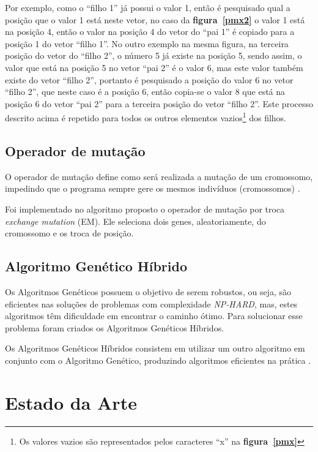 \documentclass{abnt}
\begin{document}
	   		Por exemplo, como o ``filho 1'' já possui o valor 1, então é pesquisado qual a posição que o valor 1 está neste vetor, no caso da \textbf{figura~\ref{pmx2}} o valor 1 está na posição 4, então o valor na posição 4 do vetor do ``pai 1'' é copiado para a posição 1 do vetor ``filho 1''. No outro exemplo na mesma figura, na terceira posição do vetor do ``filho 2'',  o número 5 já existe na posição 5, sendo assim, o valor que está na posição 5 no vetor ``pai 2'' é o valor 6, mas este valor também existe do vetor ``filho 2'', portanto é pesquisado a posição do valor 6 no vetor ``filho 2'', que neste caso é a posição 6, então copia-se o valor 8 que está na posição 6 do vetor ``pai 2'' para a terceira posição do vetor ``filho 2''. 
	   		Este processo descrito acima é repetido para todos os outros elementos vazios\footnote{Os valores vazios são representados pelos caracteres ``x'' na \textbf{figura~\ref{pmx}}} dos filhos.
	   		  
		\section{Operador de mutação}
			\label{Sem}
			O operador de mutação define como será realizada a mutação de um cromossomo, impedindo que o programa sempre gere os mesmos indivíduos (cromossomos) \cite{0012-pdf}.

			Foi implementado no algoritmo proposto o operador de mutação por troca \textit{exchange mutation} (EM). Ele seleciona dois genes, aleatoriamente, do cromossomo e os troca de posição.

		\section{Algoritmo Genético Híbrido}

			Os Algoritmos  Genéticos possuem o objetivo de serem robustos, ou seja, são eficientes nas soluções de problemas com complexidade \textit{NP-HARD}, mas, estes algoritmos têm dificuldade em encontrar o caminho ótimo. Para solucionar esse problema foram criados os Algoritmos Genéticos Híbridos.

			Os Algoritmos Genéticos Híbridos consistem em utilizar um outro algoritmo em conjunto com o Algoritmo Genético, produzindo algoritmos eficientes na prática \cite{TravelingTheory}.
			
		\chapter{Estado da Arte}
		
\end{document}
